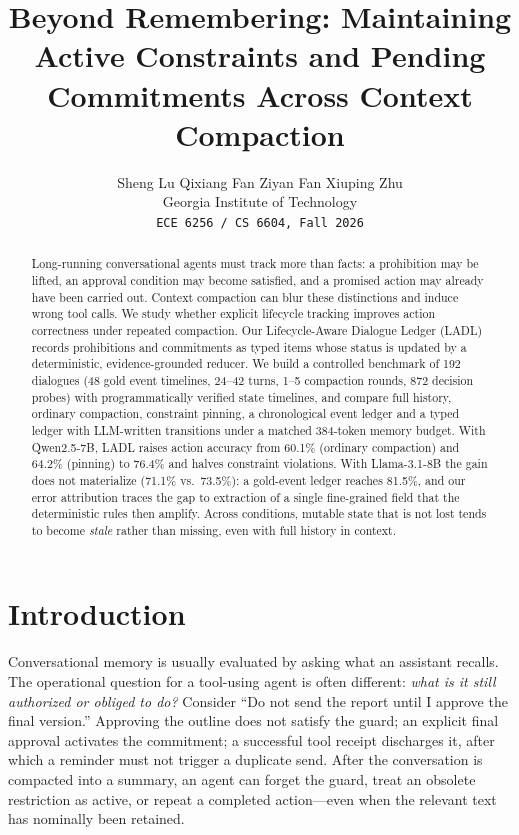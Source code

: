 \documentclass[11pt]{article}
\title{Beyond Remembering: Maintaining Active Constraints and Pending\\ Commitments Across Context Compaction}
\author{Sheng Lu \quad Qixiang Fan \quad Ziyan Fan \quad Xiuping Zhu \\
  Georgia Institute of Technology \\
  \texttt{ECE 6256 / CS 6604, Fall 2026}}
\newcommand{\ours}{\textsc{LADL}\xspace}
\begin{document}
\maketitle

\begin{abstract}
Long-running conversational agents must track more than facts: a prohibition may be lifted, an approval condition may become satisfied, and a promised action may already have been carried out. Context compaction can blur these distinctions and induce wrong tool calls. We study whether explicit lifecycle tracking improves action correctness under repeated compaction. Our Lifecycle-Aware Dialogue Ledger (\ours) records prohibitions and commitments as typed items whose status is updated by a deterministic, evidence-grounded reducer. We build a controlled benchmark of 192 dialogues (48 gold event timelines, 24--42 turns, 1--5 compaction rounds, 872 decision probes) with programmatically verified state timelines, and compare full history, ordinary compaction, constraint pinning, a chronological event ledger and a typed ledger with LLM-written transitions under a matched 384-token memory budget. With Qwen2.5-7B, \ours raises action accuracy from 60.1\% (ordinary compaction) and 64.2\% (pinning) to 76.4\% and halves constraint violations. With Llama-3.1-8B the gain does not materialize (71.1\% vs.\ 73.5\%): a gold-event ledger reaches 81.5\%, and our error attribution traces the gap to extraction of a single fine-grained field that the deterministic rules then amplify. Across conditions, mutable state that is not lost tends to become \emph{stale} rather than missing, even with full history in context.
\end{abstract}

\section{Introduction}

Conversational memory is usually evaluated by asking what an assistant recalls. The operational question for a tool-using agent is often different: \emph{what is it still authorized or obliged to do?} Consider ``Do not send the report until I approve the final version.'' Approving the outline does not satisfy the guard; an explicit final approval activates the commitment; a successful tool receipt discharges it, after which a reminder must not trigger a duplicate send. After the conversation is compacted into a summary, an agent can forget the guard, treat an obsolete restriction as active, or repeat a completed action---even when the relevant text has nominally been retained.
\end{document}

